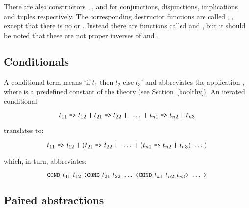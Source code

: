 \noindent There are also constructors
,
,
 and
for conjunctions, disjunctions, implications and tuples respectively.
The corresponding destructor functions are called , \etc,
except that there is no  or . Instead there are
functions called  and , but it should be noted
that these are not proper inverses of  and
.



\subsection{Conditionals}
\label{conditionals}

A conditional
 term  means
`if $t_1$ then $t_2$ else
$t_3$' and abbreviates the application
, where 
is a predefined
constant of the theory  (see Section~\ref{boolthy}).
An iterated conditional

\[
t_{11}\ \ml{=>}\ t_{12}\ \ml{|}\
t_{21}\ \ml{=>}\ t_{22}\ \ml{|}\
\ \ldots\ \ml{|}\
t_{n1}\ \ml{=>}\ t_{n2}\ \ml{|}\ t_{n3}
\]

\noindent translates to:

\[
t_{11}\ \ml{=>}\ t_{12}\ \ml{|}\
(t_{21}\ \ml{=>}\ t_{22}\ \ml{|}\
\ \ldots\ \ml{|}\
(t_{n1}\ \ml{=>}\ t_{n2}\ \ml{|}\ t_{n3})\ \ldots\ )
\]

\noindent which, in turn, abbreviates:

\[\ml{COND}\ t_{11}\ t_{12}\ \ml{(COND}\ t_{21}\ t_{22}\ \ldots\
\ml{(COND}\ t_{n1}\ t_{n2}\ t_{n3}\ml{)}\ \ldots\ \ml{)}\]

\subsection{Paired abstractions}
\label{HOL-varstruct}

